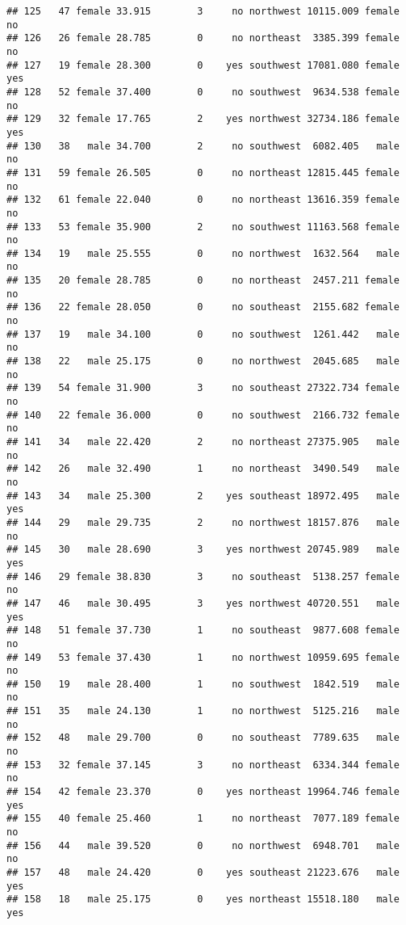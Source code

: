 \documentclass[
]{article}
\begin{document}
\begin{verbatim}
## 125   47 female 33.915        3     no northwest 10115.009 female       no
## 126   26 female 28.785        0     no northeast  3385.399 female       no
## 127   19 female 28.300        0    yes southwest 17081.080 female      yes
## 128   52 female 37.400        0     no southwest  9634.538 female       no
## 129   32 female 17.765        2    yes northwest 32734.186 female      yes
## 130   38   male 34.700        2     no southwest  6082.405   male       no
## 131   59 female 26.505        0     no northeast 12815.445 female       no
## 132   61 female 22.040        0     no northeast 13616.359 female       no
## 133   53 female 35.900        2     no southwest 11163.568 female       no
## 134   19   male 25.555        0     no northwest  1632.564   male       no
## 135   20 female 28.785        0     no northeast  2457.211 female       no
## 136   22 female 28.050        0     no southeast  2155.682 female       no
## 137   19   male 34.100        0     no southwest  1261.442   male       no
## 138   22   male 25.175        0     no northwest  2045.685   male       no
## 139   54 female 31.900        3     no southeast 27322.734 female       no
## 140   22 female 36.000        0     no southwest  2166.732 female       no
## 141   34   male 22.420        2     no northeast 27375.905   male       no
## 142   26   male 32.490        1     no northeast  3490.549   male       no
## 143   34   male 25.300        2    yes southeast 18972.495   male      yes
## 144   29   male 29.735        2     no northwest 18157.876   male       no
## 145   30   male 28.690        3    yes northwest 20745.989   male      yes
## 146   29 female 38.830        3     no southeast  5138.257 female       no
## 147   46   male 30.495        3    yes northwest 40720.551   male      yes
## 148   51 female 37.730        1     no southeast  9877.608 female       no
## 149   53 female 37.430        1     no northwest 10959.695 female       no
## 150   19   male 28.400        1     no southwest  1842.519   male       no
## 151   35   male 24.130        1     no northwest  5125.216   male       no
## 152   48   male 29.700        0     no southeast  7789.635   male       no
## 153   32 female 37.145        3     no northeast  6334.344 female       no
## 154   42 female 23.370        0    yes northeast 19964.746 female      yes
## 155   40 female 25.460        1     no northeast  7077.189 female       no
## 156   44   male 39.520        0     no northwest  6948.701   male       no
## 157   48   male 24.420        0    yes southeast 21223.676   male      yes
## 158   18   male 25.175        0    yes northeast 15518.180   male      yes

\end{verbatim}
\end{document}
